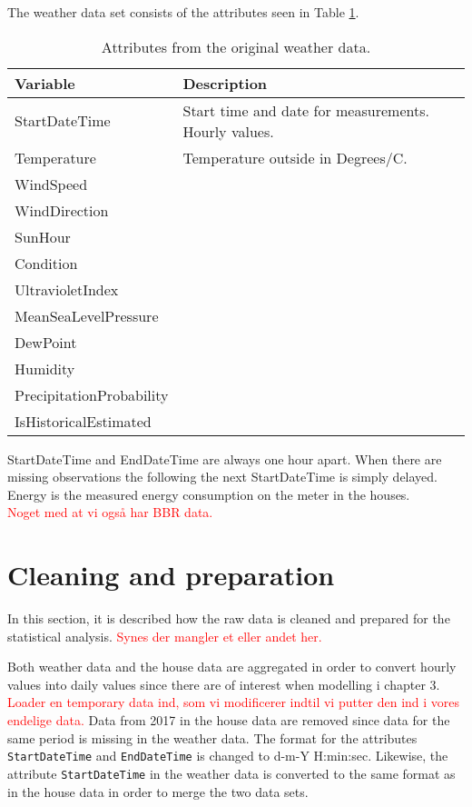 The weather data set consists of the attributes seen in Table \ref{tab: weatherdata}.
\begin{table}[H]
    \centering
    \begin{tabular}{ll}
     \hline
     \textbf{Variable} & \textbf{Description} \\
    \hline
    \hline
    StartDateTime  &  Start time and date for measurements. Hourly values.\\
    Temperature  &  Temperature outside in Degrees/C. \\
    WindSpeed  &  \\
    WindDirection  &  \\
    SunHour  &  \\
    Condition  & \\
    UltravioletIndex  &   \\
    MeanSeaLevelPressure  & \\
    DewPoint  &  \\
    Humidity  &  \\
    PrecipitationProbability & \\
    IsHistoricalEstimated & \\
    \hline
    \end{tabular}
    \caption{Attributes from the original weather data.}
    \label{tab: weatherdata}
\end{table}   

StartDateTime and EndDateTime are always one hour apart. When there 
are missing observations the following the next StartDateTime is simply delayed.
Energy is the measured energy consumption on the meter in the houses. \\

\noindent \textcolor{red}{Noget med at vi også har BBR data.}

\section{Cleaning and preparation}
In this section, it is described how the raw data is cleaned and prepared for the statistical analysis. \textcolor{red}{Synes der mangler et eller andet her.}

Both weather data and the house data are aggregated in order to convert hourly values into daily values since there are of interest when modelling i chapter 3. 
\textcolor{red}{Loader en temporary data ind, som vi modificerer indtil vi putter den ind i vores endelige data.} Data from 2017 in the house data are removed since data for the same period is missing in the weather data. 
The format for the attributes \texttt{StartDateTime} and \texttt{EndDateTime} is changed to d-m-Y H:min:sec.
Likewise, the attribute \texttt{StartDateTime} in the weather data is converted to the same format as in the house data in order to merge the two data sets. 

